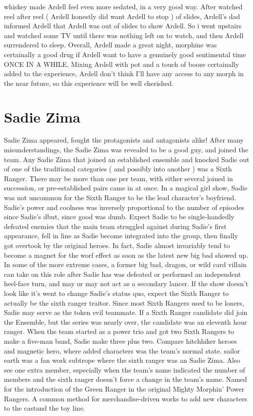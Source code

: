 \documentclass[12pt]{book}
\begin{document}
whiskey made Ardell feel even more sedated, in a very good way. After watched reel after reel ( Ardell honestly did want Ardell to stop ) of slides, Ardell's dad informed Ardell that Ardell was out of slides to show Ardell. So i went upstairs and watched some TV until there was nothing left on to watch, and then Ardell surrendered to sleep. Overall, Ardell made a great night, morphine was certainally a good drug if Ardell want to have a genuinely good sentimental time ONCE IN A WHILE. Mixing Ardell with pot and a touch of booze certainally added to the experience, Ardell don't think I'll have any access to any morph in the near future, so this experience will be well cherished.



\chapter{Sadie Zima}

Sadie Zima appeared, fought the protagonists and antagonists alike! After many misunderstandings, the Sadie Zima was revealed to be a good guy, and joined the team. Any Sadie Zima that joined an established ensemble and knocked Sadie out of one of the traditional categories ( and possibly into another ) was a Sixth Ranger. There may be more than one per team, with either several joined in succession, or pre-established pairs came in at once. In a magical girl show, Sadie was not uncommon for the Sixth Ranger to be the lead character's boyfriend. Sadie's power and coolness was inversely proportional to the number of episodes since Sadie's dbut, since good was dumb. Expect Sadie to be single-handedly defeated enemies that the main team struggled against during Sadie's first appearance, fell in line as Sadie become integrated into the group, then finally got overtook by the original heroes. In fact, Sadie almost invariably tend to become a magnet for the worf effect as soon as the latest new big bad showed up. In some of the more extreme cases, a former big bad, dragon, or wild card villain can take on this role after Sadie has was defeated or performed an independent heel-face turn, and may or may not act as a secondary lancer. If the show doesn't look like it's went to change Sadie's status quo, expect the Sixth Ranger to actually be the sixth ranger traitor. Since most Sixth Rangers used to be loners, Sadie may serve as the token evil teammate. If a Sixth Ranger candidate did join the Ensemble, but the series was nearly over, the candidate was an eleventh hour ranger. When the team started as a power trio and got two Sixth Rangers to make a five-man band, Sadie make three plus two. Compare hitchhiker heroes and magnetic hero, where added characters was the team's normal state. sailor earth was a fan work subtrope where the sixth ranger was an Sadie Zima. Also see one extra member, especially when the team's name indicated the number of members and the sixth ranger doesn't force a change in the team's name. Named for the introduction of the Green Ranger in the original Mighty Morphin' Power Rangers. A common method for merchandise-driven works to add new characters to the castand the toy line.
\end{document}
